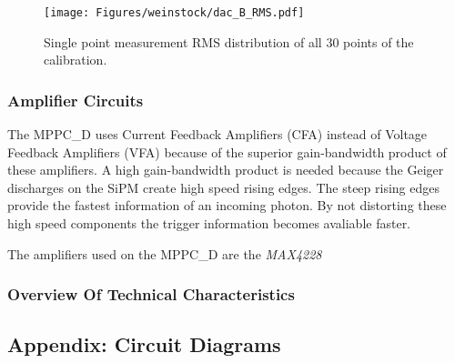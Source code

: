 \documentclass[]{article}
\begin{document}
	\begin{figure}[t]
		\centering
			\texttt{[image: Figures/weinstock/dac\_B\_RMS.pdf]}
		\caption{Single point measurement RMS distribution of all $30$ points of the calibration.}
		\label{fig:dac_precision}
	\end{figure}	

\newpage

\subsubsection{Amplifier Circuits}

The MPPC\_D uses Current Feedback Amplifiers (CFA) instead of Voltage Feedback Amplifiers (VFA) because of the superior gain-bandwidth product of these amplifiers. A high 
gain-bandwidth product is needed because the Geiger discharges on the SiPM create high speed rising edges. The steep rising edges provide the fastest information of an incoming photon. 
By not distorting these high speed components the trigger information becomes avaliable faster.

The amplifiers used on the MPPC\_D are the \emph{MAX4228} 

\subsubsection{Overview Of Technical Characteristics}

\subsection{Appendix: Circuit Diagrams}
\end{document}
